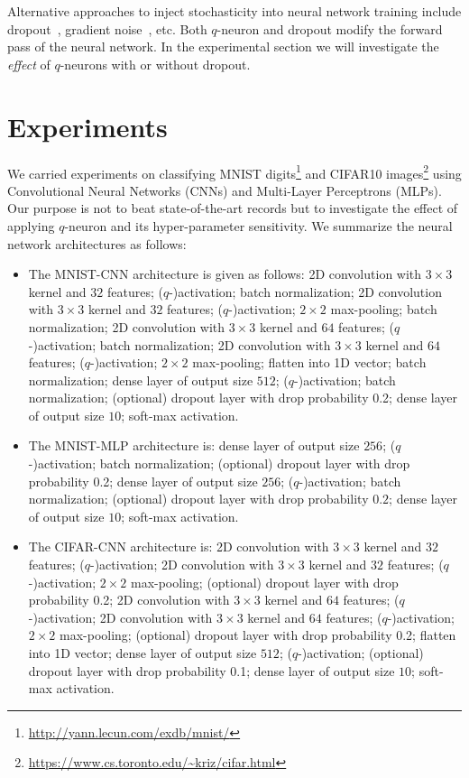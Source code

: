 \documentclass{article}
\begin{document}
Alternative approaches to inject stochasticity into neural network training
include dropout~\cite{dropout}, gradient noise~\cite{gradientnoise}, etc.
Both $q$-neuron and dropout modify the forward pass of the neural network.
In the experimental section we will investigate the {\em effect} of $q$-neurons
with or without dropout.


\section{Experiments}\label{sec:exp}

We carried experiments on classifying MNIST digits\footnote{\url{http://yann.lecun.com/exdb/mnist/}}
and CIFAR10 images\footnote{\url{https://www.cs.toronto.edu/~kriz/cifar.html}}
using Convolutional Neural Networks (CNNs) and Multi-Layer Perceptrons (MLPs).
Our purpose is not to beat state-of-the-art records but to
investigate the effect of applying $q$-neuron and its hyper-parameter sensitivity.
We summarize the neural network architectures as follows:


\begin{itemize}
\item The MNIST-CNN architecture is given as follows:
2D convolution with $3\times3$ kernel and $32$ features;
($q$-)activation;
batch normalization;
2D convolution with $3\times3$ kernel and $32$ features;
($q$-)activation;
$2\times2$ max-pooling;
batch normalization;
2D convolution with $3\times3$ kernel and $64$ features;
($q$-)activation;
batch normalization;
2D convolution with $3\times3$ kernel and $64$ features;
($q$-)activation;
$2\times2$ max-pooling;
flatten into 1D vector;
batch normalization;
dense layer of output size $512$;
($q$-)activation;
batch normalization;
(optional) dropout layer with drop probability 0.2;
dense layer of output size $10$;
soft-max activation.

\item The MNIST-MLP architecture is:
dense layer of output size $256$;
($q$-)activation;
batch normalization;
(optional) dropout layer with drop probability 0.2;
dense layer of output size $256$;
($q$-)activation;
batch normalization;
(optional) dropout layer with drop probability $0.2$;
dense layer of output size $10$;
soft-max activation.

\item The CIFAR-CNN architecture is:
2D convolution with $3\times3$ kernel and $32$ features;
($q$-)activation;
2D convolution with $3\times3$ kernel and $32$ features;
($q$-)activation;
$2\times2$ max-pooling;
(optional) dropout layer with drop probability 0.2;
2D convolution with $3\times3$ kernel and $64$ features;
($q$-)activation;
2D convolution with $3\times3$ kernel and $64$ features;
($q$-)activation;
$2\times2$ max-pooling;
(optional) dropout layer with drop probability 0.2;
flatten into 1D vector;
dense layer of output size $512$;
($q$-)activation;
(optional) dropout layer with drop probability 0.1;
dense layer of output size $10$;
soft-max activation.
\end{itemize}
\end{document}
